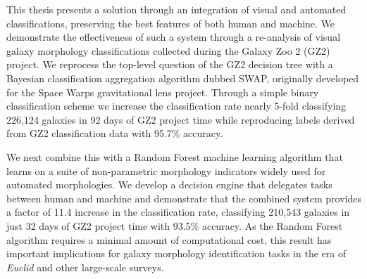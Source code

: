 This thesis presents a solution through an integration of visual and automated classifications, preserving the best features of both human and machine. We demonstrate the effectiveness of such a system through a re-analysis of visual galaxy morphology classifications collected during the Galaxy Zoo 2 (GZ2) project. We reprocess the top-level question of the GZ2 decision tree with a Bayesian classification aggregation algorithm dubbed SWAP, originally developed for the Space Warps gravitational lens project. Through a simple binary classification scheme we increase the classification rate nearly 5-fold classifying 226,124 galaxies in 92 days of GZ2 project time while reproducing labels derived from GZ2 classification data with 95.7\% accuracy.

We next combine this with a Random Forest machine learning algorithm that learns on a suite of non-parametric morphology indicators widely used for automated morphologies. We develop a decision engine that delegates tasks between human and machine and demonstrate that the combined system provides a factor of 11.4 increase in the classification rate, classifying 
210,543 galaxies in just 32 days of GZ2 project time with 93.5\% accuracy. As the Random Forest algorithm requires a minimal amount of computational cost, this result has
important implications for galaxy morphology identification tasks in the 
era of \textit{Euclid} and other large-scale surveys.











